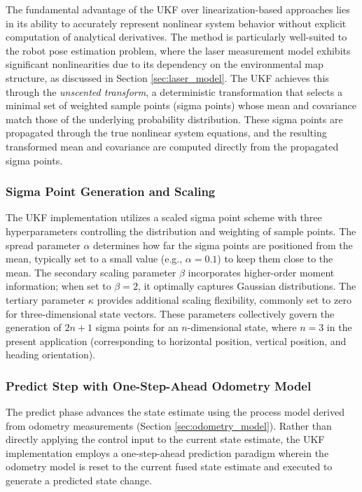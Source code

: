 \documentclass[conference]{IEEEtran}
\begin{document}
The fundamental advantage of the UKF over linearization-based approaches lies in its ability to accurately represent nonlinear system behavior without explicit computation of analytical derivatives. The method is particularly well-suited to the robot pose estimation problem, where the laser measurement model exhibits significant nonlinearities due to its dependency on the environmental map structure, as discussed in Section \ref{sec:laser_model}. The UKF achieves this through the \textit{unscented transform}, a deterministic transformation that selects a minimal set of weighted sample points (sigma points) whose mean and covariance match those of the underlying probability distribution. These sigma points are propagated through the true nonlinear system equations, and the resulting transformed mean and covariance are computed directly from the propagated sigma points.

\subsubsection{Sigma Point Generation and Scaling}

The UKF implementation utilizes a scaled sigma point scheme with three hyperparameters controlling the distribution and weighting of sample points. The spread parameter $\alpha$ determines how far the sigma points are positioned from the mean, typically set to a small value (e.g., $\alpha = 0.1$) to keep them close to the mean. The secondary scaling parameter $\beta$ incorporates higher-order moment information; when set to $\beta = 2$, it optimally captures Gaussian distributions. The tertiary parameter $\kappa$ provides additional scaling flexibility, commonly set to zero for three-dimensional state vectors. These parameters collectively govern the generation of $2n + 1$ sigma points for an $n$-dimensional state, where $n = 3$ in the present application (corresponding to horizontal position, vertical position, and heading orientation).

\subsubsection{Predict Step with One-Step-Ahead Odometry Model}

The predict phase advances the state estimate using the process model derived from odometry measurements (Section \ref{sec:odometry_model}). Rather than directly applying the control input to the current state estimate, the UKF implementation employs a one-step-ahead prediction paradigm wherein the odometry model is reset to the current fused state estimate and executed to generate a predicted state change.
\end{document}
